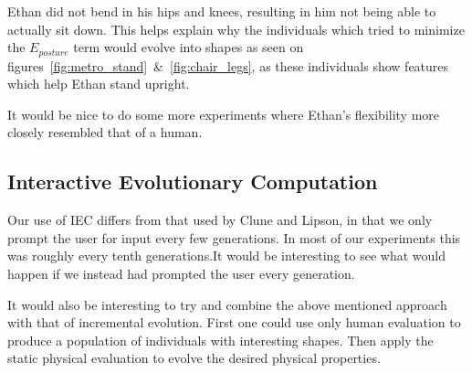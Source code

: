 Ethan did not bend in his hips and knees, resulting in him not being able to 
actually sit down. This helps explain why the individuals which tried to 
minimize the $E_{posture}$ term would evolve into shapes as seen on
figures~\ref{fig:metro_stand}~\&~\ref{fig:chair_legs}, as these individuals 
show features which help Ethan stand upright. 

It would be nice to do 
some more experiments where Ethan's flexibility more closely resembled that of 
a human.

\subsection{Interactive Evolutionary Computation}
Our use of IEC differs from that used by Clune and 
Lipson\cite{Clune:2011:EOG:2078245.2078246}, in that we only prompt the user 
for input every few generations. In most of our experiments this was roughly 
every tenth generations.It would be interesting to see what would happen if we 
instead had prompted the user every generation. 

It would also be interesting to try and combine the above mentioned approach 
with that of incremental evolution. First one could use only human evaluation 
to produce a population of individuals with interesting shapes. Then apply the 
static physical evaluation to evolve the desired physical properties.